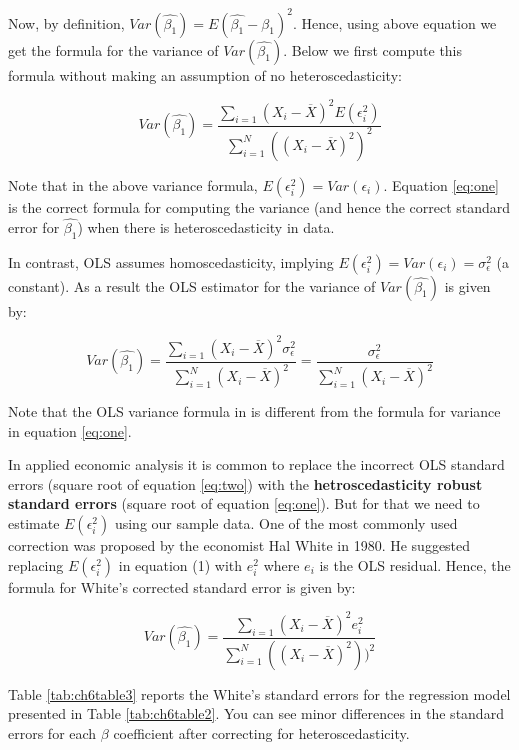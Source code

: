 \documentclass[
]{book}
\theoremstyle{definition}
\theoremstyle{definition}
\theoremstyle{definition}
\theoremstyle{definition}
\theoremstyle{remark}
\begin{document}
Now, by definition, \(Var(\widehat{\beta_1})=E(\widehat{\beta_1}-\beta_1)^2\). Hence, using above equation we get the formula for the variance of \(Var(\widehat{\beta_1})\). Below we first compute this formula without making an assumption of no heteroscedasticity:

\begin{equation}
Var(\widehat{\beta_1})=\frac{\sum_{i=1}(X_i-\overline{X})^2E(\epsilon_i^2)}{\sum_{i=1}^N ((X_i-\overline{X})^2)^2}
\label{eq:one}
\end{equation}

Note that in the above variance formula, \(E(\epsilon_i^2)=Var(\epsilon_i)\). Equation \eqref{eq:one} is the correct formula for computing the variance (and hence the correct standard error for \(\widehat{\beta_1}\)) when there is heteroscedasticity in data.

In contrast, OLS assumes homoscedasticity, implying \(E(\epsilon_i^2)=Var(\epsilon_i)=\sigma^2_\epsilon\) (a constant). As a result the OLS estimator for the variance of \(Var(\widehat{\beta_1})\) is given by:

\begin{equation}
Var(\widehat{\beta_1})=\frac{\sum_{i=1}(X_i-\overline{X})^2\sigma^2_\epsilon}{\sum_{i=1}^N (X_i-\overline{X})^2}=\frac{\sigma^2_\epsilon}{\sum_{i=1}^N (X_i-\overline{X})^2}
\label{eq:two}
\end{equation}

Note that the OLS variance formula in is different from the formula for variance in equation \eqref{eq:one}.

In applied economic analysis it is common to replace the incorrect OLS standard errors (square root of equation \eqref{eq:two}) with the \textbf{hetroscedasticity robust standard errors} (square root of equation \eqref{eq:one}). But for that we need to estimate \(E(\epsilon_i^2)\) using our sample data. One of the most commonly used correction was proposed by the economist Hal White in 1980. He suggested replacing \(E(\epsilon_i^2)\) in equation (1) with \(e_i^2\) where \(e_i\) is the OLS residual. Hence, the formula for White's corrected standard error is given by:

\[Var(\widehat{\beta_1})=\frac{\sum_{i=1}(X_i-\overline{X})^2e_i^2}{\sum_{i=1}^N ((X_i-\overline{X})^2))^2}\]

Table \ref{tab:ch6table3} reports the White's standard errors for the regression model presented in Table \ref{tab:ch6table2}. You can see minor differences in the standard errors for each \(\beta\) coefficient after correcting for heteroscedasticity.
\end{document}
